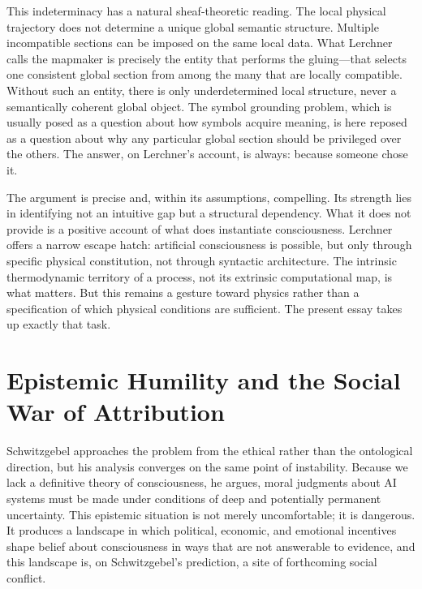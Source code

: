 \documentclass[11pt]{article}
\theoremstyle{definition}
\theoremstyle{remark}
\begin{document}
This indeterminacy has a natural sheaf-theoretic reading. The local physical trajectory does
not determine a unique global semantic structure. Multiple incompatible sections can be
imposed on the same local data. What Lerchner calls the mapmaker is precisely the entity
that performs the gluing---that selects one consistent global section from among the many
that are locally compatible. Without such an entity, there is only underdetermined local
structure, never a semantically coherent global object. The symbol grounding problem, which
is usually posed as a question about how symbols acquire meaning, is here reposed as a
question about why any particular global section should be privileged over the others. The
answer, on Lerchner's account, is always: because someone chose it.

The argument is precise and, within its assumptions, compelling. Its strength lies in
identifying not an intuitive gap but a structural dependency. What it does not provide is
a positive account of what does instantiate consciousness. Lerchner offers a narrow escape
hatch: artificial consciousness is possible, but only through specific physical constitution,
not through syntactic architecture. The intrinsic thermodynamic territory of a process,
not its extrinsic computational map, is what matters. But this remains a gesture toward
physics rather than a specification of which physical conditions are sufficient. The present
essay takes up exactly that task.

\section{Epistemic Humility and the Social War of Attribution}

Schwitzgebel approaches the problem from the ethical rather than the ontological direction,
but his analysis converges on the same point of instability. Because we lack a definitive
theory of consciousness, he argues, moral judgments about AI systems must be made under
conditions of deep and potentially permanent uncertainty. This epistemic situation is not
merely uncomfortable; it is dangerous. It produces a landscape in which political, economic,
and emotional incentives shape belief about consciousness in ways that are not answerable to
evidence, and this landscape is, on Schwitzgebel's prediction, a site of forthcoming social
conflict.
\end{document}
